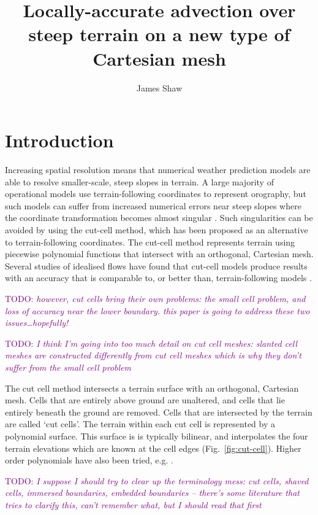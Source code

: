 \documentclass{article}
\title{Locally-accurate advection over steep terrain on a new type of Cartesian mesh \\ \TODO{(working title)}}
\author{James Shaw}
\newcommand{\TODO}[1]{\textcolor{purple}{TODO: \emph{#1}}}
\begin{document}
\maketitle

\section{Introduction}

Increasing spatial resolution means that numerical weather prediction models are able to resolve smaller-scale, steep slopes in terrain.  A large majority of operational models use terrain-following coordinates to represent orography, but such models can suffer from increased numerical errors near steep slopes where the coordinate transformation becomes almost singular \citep{nikiforakis2009}.  Such singularities can be avoided by using the cut-cell method, which has been proposed as an alternative to terrain-following coordinates.  The cut-cell method represents terrain using piecewise polynomial functions that intersect with an orthogonal, Cartesian mesh.  Several studies of idealised flows have found that cut-cell models produce results with an accuracy that is comparable to, or better than, terrain-following models \citep{yamazaki-satomura2008,good2014,shaw-weller2016}.


\TODO{however, cut cells bring their own problems: the small cell problem, and loss of accuracy near the lower boundary.  this paper is going to address these two issues\ldots hopefully!}


\TODO{I think I'm going into too much detail on cut cell meshes: slanted cell meshes are constructed differently from cut cell meshes which is why they don't suffer from the small cell problem}

The cut cell method intersects a terrain surface with an orthogonal, Cartesian mesh.
Cells that are entirely above ground are unaltered, and cells that lie entirely beneath the ground are removed.
Cells that are intersected by the terrain are called `cut cells'.  The terrain within each cut cell is represented by a polynomial surface.  This surface is is typically bilinear, and interpolates the four terrain elevations which are known at the cell edges (Fig.~\ref{fig:cut-cell}).  Higher order polynomials have also been tried, e.g. \citet{kirkpatrick2003}.

\TODO{I suppose I should try to clear up the terminology mess: cut cells, shaved cells, immersed boundaries, embedded boundaries -- there's some literature that tries to clarify this, can't remember what, but I should read that first}
\end{document}
